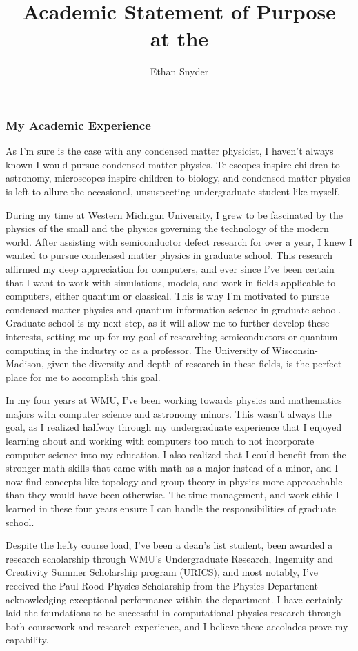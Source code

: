 \documentclass[11pt]{article}
\title{\vspace{-5em}Academic Statement of Purpose\\
	\large \dept{} at the \school{}}
\author{Ethan Snyder}
\date{}
\newcommand{\school}{University of Wisconsin-Madison}
\begin{document}
\maketitle
\subsubsection*{My Academic Experience}
As I'm sure is the case with any condensed matter physicist, I haven't always known I would pursue condensed matter physics. Telescopes inspire children to astronomy, microscopes inspire children to biology, and condensed matter physics is left to allure the occasional, unsuspecting undergraduate student like myself.

During my time at Western Michigan University, I grew to be fascinated by the physics of the small and the physics governing the technology of the modern world. After assisting with semiconductor defect research for over a year, I knew I wanted to pursue condensed matter physics in graduate school. This research affirmed my deep appreciation for computers, and ever since I've been certain that I want to work with simulations, models, and work in fields applicable to computers, either quantum or classical. This is why I'm motivated to pursue condensed matter physics and quantum information science in graduate school. Graduate school is my next step, as it will allow me to further develop these interests, setting me up for my goal of researching semiconductors or quantum computing in the industry or as a professor. The \school{}, given the diversity and depth of research in these fields, is the perfect place for me to accomplish this goal.

In my four years at WMU, I've been working towards physics and mathematics majors with computer science and astronomy minors. This wasn't always the goal, as I realized halfway through my undergraduate experience that I enjoyed learning about and working with computers too much to not incorporate computer science into my education. I also realized that I could benefit from the stronger math skills that came with math as a major instead of a minor, and I now find concepts like topology and group theory in physics more approachable than they would have been otherwise. The time management, and work ethic I learned in these four years ensure I can handle the responsibilities of graduate school.

Despite the hefty course load, I've been a dean's list student, been awarded a research scholarship through WMU's Undergraduate Research, Ingenuity and Creativity Summer Scholarship program (URICS), and most notably, I've received the Paul Rood Physics Scholarship from the Physics Department acknowledging exceptional performance within the department. I have certainly laid the foundations to be successful in computational physics research through both coursework and research experience, and I believe these accolades prove my capability.
\end{document}
